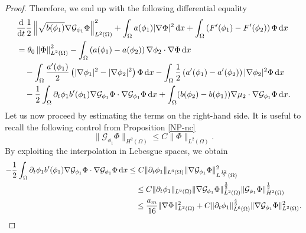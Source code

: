 \documentclass[11pt,reqno]{amsart}
\theoremstyle{remark}
\newcommand \norm[1] {\left\Vert #1\right\Vert}
\def\G{\mathcal{G}}
\def\d{{\rm d}}
\def\uu{\boldsymbol{u}}
\def\ddt{\frac{\d}{\d t}}
\def\vphi{\varphi}
\numberwithin{equation}{section}
\def\d{{\rm d}}
\begin{document}
\begin{proof}
Therefore, we end up with the following differential equality
\begin{align}
&\ddt \frac{1}{2} \norm{\sqrt{b(\phi_1)}\nabla \G_{\phi_1} \Phi}_{L^2(\Omega)}^2
+ \int_\Omega a(\phi_1) |\nabla \Phi |^2 \, \d x
 +
  \int_\Omega \left( F'(\phi_1)-F'(\phi_2) \right)   \Phi \, \d x
  \notag
\\
&=   \theta_0 \norm{\Phi}_{L^2(\Omega)}^2
 - \int_\Omega \left( a(\phi_1)-a(\phi_2)\right) \nabla \phi_2 \cdot \nabla \Phi \, \d x
 \notag
 \\
 &\quad -\int_\Omega \frac{a'(\phi_1)}{2}  \left( |\nabla \phi_1|^2-|\nabla \phi_2|^2\right) \Phi
 \, \d x
 - \int_\Omega \frac12  \left( a'(\phi_1)-a'(\phi_2)\right) | \nabla \phi_2|^2 \Phi \, \d x
 \notag
 \\
 &\quad
 -\frac12 \int_\Omega \partial_t \phi_1 b'(\phi_1) \nabla \G_{\phi_1} \Phi \cdot \nabla \G_{\phi_1} \Phi\,\d x
  + \int_\Omega (b(\phi_2)-b(\phi_1)) \nabla \mu_2 \cdot \nabla \G_{\phi_1} \Phi \, \d x.
  \label{DE-3D}
   \end{align}
Let us now proceed by estimating the terms on the right-hand side. It is useful to recall the following control from Proposition \ref{NP-nc}
$$
\| \G_{\phi_1} \Phi\|_{H^2(\Omega)}
\leq C \| \Phi\|_{L^2(\Omega)}.
$$
By exploiting the interpolation in Lebesgue spaces, we obtain
\begin{align*}
-\frac12 \int_\Omega \partial_t \phi_1 b'(\phi_1) \nabla \G_{\phi_1} \Phi \cdot \nabla \G_{\phi_1} \Phi\,\d x
&\leq C\|\partial_t\phi_1\|_{L^6(\Omega)}\|\nabla \G_{\phi_1} \Phi\|_{L^{\frac{12}{5}}(\Omega)}^2\\
&\quad\leq  C \|\partial_t\phi_1\|_{L^6(\Omega)}
\|\nabla \G_{\phi_1} 
\Phi\|_{L^2(\Omega)}^\frac32
\|\G_{\phi_1} \Phi\|_{H^2(\Omega)}^\frac12\\
&\quad \leq \frac{a_m}{16}\| \nabla \Phi\|_{L^2(\Omega)}^2
+C\|\partial_t\phi_1\|_{L^6(\Omega)}^\frac43
\|\nabla \G_{\phi_1} \Phi\|_{L^2(\Omega)}^2.
\end{align*}

\end{proof}
\end{document}
